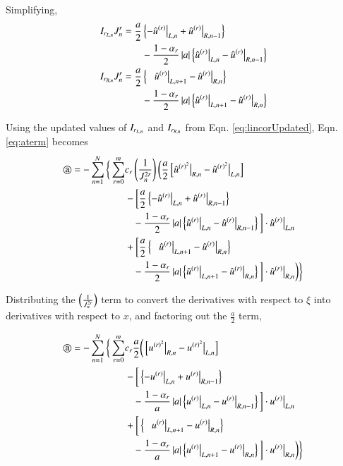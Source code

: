 Simplifying,
\begin{equation}
\label{eq:lincorUpdated}
\begin{split}
 \IL[r] J_n^r= \frac{a}{2}& \l\{-\urdrL[n] + \urdrR[n-1] \r\} \\
 &- \frac{1-{\alpha_r}}{2} \l|a\r| \l\{\urdrL
- \urdrR[n-1] \r\} \\
 \IR[r] J_n^r= \frac{a}{2}& \l\{\mbox{\;\;\:} \urdrL[n+1] - \urdrR[n] \r\} \\
 &- \frac{1-{\alpha_r}}{2}
\l|a\r|\l\{\urdrL[n+1] - \urdrR[n] \r\} 
\end{split}
\end{equation}


Using the updated values of $\IL[r]$ and $\IR[r]$ from Eqn. \eqref{eq:lincorUpdated},
Eqn. \eqref{eq:aterm} becomes
\begin{equation}
\begin{split}
 \text{\textcircled{a}} = -\sum_{n=1}^{N}  \bigg\{
 \sum^m_{r=0} & c_r \l( \frac{1}{J_n^{2r}}\r)
 \bigg( \frac{a}{2} 
 \l[ \hat{u}^{{ (r)}^2} \big|_{R,n} - \hat{u}^{{ (r)}^2} \big|_{L,n} \r] \\
 &- \bigg[ \frac{a}{2} \l\{-\urdrL[n] + \urdrR[n-1] \r\} \\
 &\mbox{\;\;\;} - \frac{1-{\alpha_r}}{2} \l|a\r| \l\{\urdrL
- \urdrR[n-1] \r\} \bigg]  \cdot \urdrL\\
 &+  \bigg[ \frac{a}{2} \l\{\mbox{\;\;\:} \urdrL[n+1] - \urdrR[n] \r\} \\
 &\mbox{\;\;\;} - \frac{1-{\alpha_r}}{2} 
\l|a\r|
\l\{\urdrL[n+1] - \urdrR[n] \r\} \bigg]
 \cdot \urdrR 
\bigg)
 \bigg\} 
\end{split}
\end{equation}


Distributing the $\l(\frac{1}{J_n^{2r}}\r)$ term to convert the derivatives with respect to $\xi$
into derivatives with respect to $x$, and factoring out the $ \frac{a}{2}$ term,

\begin{equation}
\label{eq:termaphys}
\begin{split}
 \text{\textcircled{a}} = -\sum_{n=1}^{N}  \bigg\{
 \sum^m_{r=0} & c_r \frac{a}{2}
 \bigg(  
 \l[ {u}^{{ (r)}^2} \big|_{R,n} - {u}^{{ (r)}^2} \big|_{L,n} \r] \\
 &- \bigg[ \l\{-\uudrL[n] + \uudrR[n-1] \r\} \\
 &\mbox{\;\;\;} - \frac{1-{\alpha_r}}{a} \l|a\r| \l\{\uudrL -
\uudrR[n-1] \r\} \bigg]
%
 \cdot \uudrL\\
 &+  \bigg[ \l\{\mbox{\;\;\:} \uudrL[n+1] - \uudrR[n] \r\} \\
 &\mbox{\;\;\;}- \frac{1-{\alpha_r}}{a} \l|a\r|
\l\{\uudrL[n+1] - \uudrR[n] \r\} \bigg]
 \cdot \uudrR 
\bigg)
 \bigg\} 
\end{split}
\end{equation}

